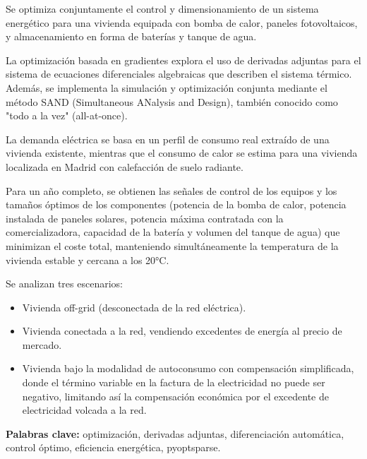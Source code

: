 Se optimiza conjuntamente el control y dimensionamiento de un sistema
energético para una vivienda equipada con bomba de calor, paneles
fotovoltaicos, y almacenamiento en forma de baterías y tanque de agua.

La optimización basada en gradientes explora el uso de derivadas adjuntas para
el sistema de ecuaciones diferenciales algebraicas que describen el sistema
térmico. Además, se implementa la simulación y optimización conjunta mediante
el método SAND (Simultaneous ANalysis and Design), también conocido como "todo
a la vez" (all-at-once).

La demanda eléctrica se basa en un perfil de consumo real extraído de una
vivienda existente, mientras que el consumo de calor se estima para una
vivienda localizada en Madrid con calefacción de suelo radiante.

Para un año completo, se obtienen las señales de control de los equipos y los
tamaños óptimos de los componentes (potencia de la bomba de calor, potencia
instalada de paneles solares, potencia máxima contratada con la
comercializadora, capacidad de la batería y volumen del tanque de agua) que
minimizan el coste total, manteniendo simultáneamente la temperatura de la
vivienda estable y cercana a los 20°C.

Se analizan tres escenarios: 

\begin{itemize} \item Vivienda off-grid (desconectada de la red eléctrica).
\item Vivienda conectada a la red, vendiendo excedentes de energía al precio de
mercado. \item Vivienda bajo la modalidad de autoconsumo con compensación
simplificada, donde el término variable en la factura de la electricidad no
puede ser negativo, limitando así la compensación económica por el excedente de
electricidad volcada a la red. \end{itemize}


\begin{flushleft} \textbf{Palabras clave:} optimización, derivadas adjuntas,
diferenciación automática, control óptimo, eficiencia energética, pyoptsparse.
\end{flushleft}

